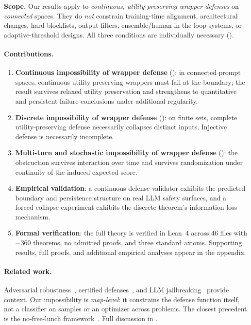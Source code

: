 \documentclass[11pt]{article}
\begin{document}
\medskip
\noindent\textbf{Scope.}
Our results apply to \emph{continuous, utility-preserving wrapper defenses} on \emph{connected} spaces. They do \emph{not} constrain training-time alignment, architectural changes, hard blocklists, output filters, ensemble/human-in-the-loop systems, or adaptive-threshold designs. All three conditions are individually necessary ().

\paragraph{Contributions.}
\begin{enumerate}[nosep]
  \item \textbf{Continuous impossibility of wrapper defense}
    ():
    in connected prompt spaces, continuous utility-preserving wrappers
    must fail at the boundary; the result survives relaxed utility
    preservation and strengthens to quantitative and persistent-failure
    conclusions under additional regularity.
  \item \textbf{Discrete impossibility of wrapper defense}
    (): on finite sets, complete
    utility-preserving defense necessarily collapses distinct inputs.
    Injective defense is necessarily incomplete.
  \item \textbf{Multi-turn and stochastic impossibility of wrapper defense}
    (): the obstruction survives
    interaction over time and survives randomization under continuity of
    the induced expected score.
  \item \textbf{Empirical validation}: a continuous-defense validator
    exhibits the predicted boundary and persistence structure on real
    LLM safety surfaces, and a forced-collapse experiment exhibits the
    discrete theorem's information-loss mechanism.
  \item \textbf{Formal verification}: the full theory is verified in
    Lean~4 across 46 files with ${\sim}360$ theorems, no admitted
    proofs, and three standard axioms. Supporting results, full proofs,
    and additional empirical analyses appear in the appendix.
\end{enumerate}


\paragraph{Related work.}
Adversarial robustness~\cite{szegedy2013intriguing,goodfellow2014explaining,carlini2017evaluating,madry2018towards,tsipras2018robustness},
certified defenses~\cite{cohen2019certified,katz2017reluplex,singh2019abstract},
and LLM jailbreaking~\cite{zou2023universal,chao2024jailbreaking,mehrotra2024tree,greshake2023indirect,mouret2015illuminating,samvelyan2024rainbow}
provide context. Our impossibility is \emph{map-level}: it constrains the defense function itself, not a classifier on samples or an optimizer across problems. The closest precedent is the no-free-lunch framework~\cite{wolpert1997no}. Full discussion in .
\end{document}
